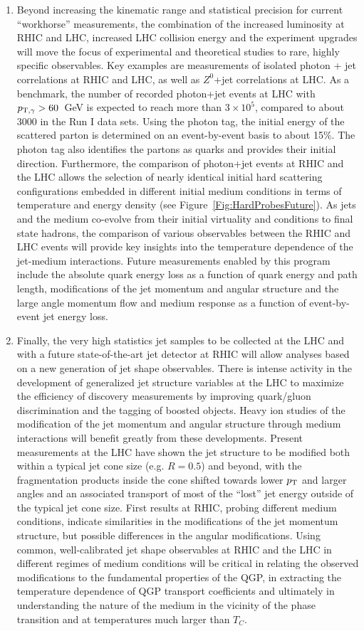 \begin{enumerate}
\item Beyond increasing the kinematic range and statistical precision for 
current ``workhorse'' measurements, the combination of the increased luminosity at RHIC and LHC, 
increased LHC collision energy and the experiment upgrades will move 
the focus of experimental and theoretical studies to rare, highly specific
observables. Key examples are measurements of isolated photon + jet 
correlations at RHIC and LHC, as well as $Z^0$+jet correlations at LHC. 
As a benchmark, the number of recorded photon+jet events at LHC 
with $p_{\mathrm{T},\gamma} > 60$~GeV is expected to reach more than $3 \times 10^5$, compared
to about 3000 in the Run I data sets. Using the photon tag, the initial
energy of the scattered parton is determined on an event-by-event basis to about 15\%.
The photon tag also identifies the partons as quarks and provides their 
initial direction. Furthermore, the comparison of photon+jet events 
at RHIC and the LHC allows the selection of nearly identical initial 
hard scattering configurations embedded in different initial medium conditions
in terms of temperature and energy density (see Figure\ \ref{Fig:HardProbesFuture}). As jets and the medium co-evolve 
from their initial virtuality and conditions to final state hadrons, 
the comparison of various observables between the RHIC and LHC events
will provide key insights into the temperature dependence of the jet-medium
interactions. Future measurements enabled by this program include the 
absolute quark energy loss
as a function of quark energy and path length, modifications of the 
jet momentum and angular structure and the large angle momentum flow
and medium response as a function of event-by-event jet energy loss.
\item Finally, the very high statistics jet samples to be collected at the LHC and 
with a future state-of-the-art jet detector at RHIC will allow analyses based on 
a new generation of jet shape observables. There is intense activity
in the development of generalized jet structure variables at the LHC to maximize
the efficiency of discovery measurements by improving quark/gluon
discrimination and the tagging of boosted objects. Heavy ion studies 
of the modification of the jet momentum and angular structure through 
medium interactions will benefit greatly from these developments.
Present measurements at the LHC have shown the jet structure to be modified 
both within a typical jet cone size (e.g. $R = 0.5$) and beyond, with
the fragmentation products inside the cone shifted towards 
lower $p_{\rm{T}}$ and larger angles and an associated transport of most of the ``lost''
jet energy outside of the typical jet cone size. First results 
at RHIC, probing different medium conditions, indicate similarities
in the modifications of the jet momentum structure, but possible
differences in the angular modifications. Using common, well-calibrated
jet shape observables at RHIC and the LHC in different regimes of 
medium conditions will be critical in relating the observed 
modifications to the fundamental properties of the QGP,
in extracting the temperature dependence of QGP transport coefficients
and ultimately in understanding the nature of the medium in the vicinity
of the phase transition and at temperatures much larger than $T_C$.


\end{enumerate}
